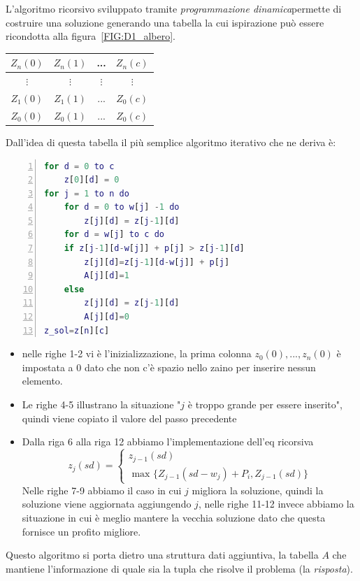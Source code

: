 \documentclass[a4paper]{article}
\begin{document}
L'algoritmo ricorsivo sviluppato tramite \textit{programmazione dinamica}permette di costruire una soluzione generando una tabella la cui ispirazione può essere ricondotta alla figura~\ref{FIG:D1_albero}.\\
\begin{center}
	\begin{tabular}{| c | c | c | c |}
  \hline
  $Z_n(0)$ & $Z_n(1)$ & ... &  $Z_n(c)$ \\
  \hline
  $ \vdots$ & $\vdots$ & $\vdots$ &  $\vdots $ \\
  \hline
  $Z_1(0)$ & $Z_1(1)$ & ... &  $Z_0(c)$ \\
  \hline
  $Z_0(0)$ & $Z_0(1)$ & ... &  $Z_0(c)$ \\
  \hline
	\end{tabular}
\end{center}
Dall'idea di questa tabella il più semplice algoritmo iterativo che ne deriva è:
\begin{lstlisting}[numbers=left,firstnumber=1,stepnumber=1, xleftmargin=15pt, language=Matlab ]
for d = 0 to c
    z[0][d] = 0
for j = 1 to n do
    for d = 0 to w[j] -1 do
    	z[j][d] = z[j-1][d]
    for d = w[j] to c do
	if z[j-1][d-w[j]] + p[j] > z[j-1][d] 
	    z[j][d]=z[j-1][d-w[j]] + p[j]
	    A[j][d]=1
	else
	    z[j][d] = z[j-1][d]
	    A[j][d]=0
z_sol=z[n][c]
\end{lstlisting}
\begin{itemize}
	\item nelle righe 1-2 vi è l'inizializzazione, la prima colonna $z_0(0),...,z_n(0)$ è impostata a 0 dato che non c'è spazio nello zaino per inserire nessun elemento.\\
	\item Le righe 4-5 illustrano la situazione "$j$ è troppo grande per essere inserito", quindi viene copiato il valore del passo precedente
	\item Dalla riga 6 alla riga 12 abbiamo l'implementazione dell'eq ricorsiva
	\begin{equation*}
        	z_j(sd)= \begin{cases} z_{j-1}(sd)\\
        	\text{ max } \{ Z_{j-1}(sd - w_j) + P_i , Z_{j-1}(sd) \}
	\end{cases}
	\end{equation*}
	Nelle righe 7-9 abbiamo il caso in cui $j$ migliora la soluzione, quindi la soluzione viene aggiornata aggiungendo $j$, nelle righe 11-12 invece abbiamo la situazione in cui è meglio mantere la vecchia soluzione dato che questa fornisce un profito migliore.
\end{itemize}
Questo algoritmo si porta dietro una struttura dati aggiuntiva, la tabella $A$ che mantiene l'informazione di quale sia la tupla che risolve il problema (la \textit{risposta}).
\end{document}
